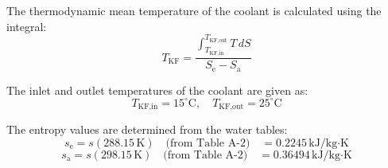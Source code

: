 The thermodynamic mean temperature of the coolant is calculated using the integral:  
\[
T_{\text{KF}} = \frac{\int_{T_{\text{KF,in}}}^{T_{\text{KF,out}}} T \, dS}{S_{\text{e}} - S_{\text{a}}}
\]  

The inlet and outlet temperatures of the coolant are given as:  
\[
T_{\text{KF,in}} = 15^\circ\text{C}, \quad T_{\text{KF,out}} = 25^\circ\text{C}
\]  

The entropy values are determined from the water tables:  
\[
s_{\text{e}} = s(288.15 \, \text{K}) \quad \text{(from Table A-2)} \quad = 0.2245 \, \text{kJ/kg·K}
\]  
\[
s_{\text{a}} = s(298.15 \, \text{K}) \quad \text{(from Table A-2)} \quad = 0.36494 \, \text{kJ/kg·K}
\]